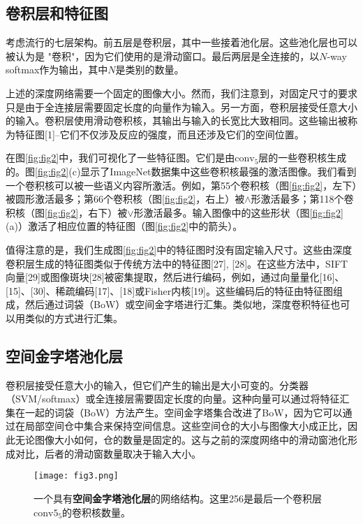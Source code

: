 \documentclass[../main.tex]{subfile}
\begin{document}
\subsection{卷积层和特征图}

考虑流行的七层架构\cite{alexnet, zfnet}。前五层是卷积层，其中一些接着池化层。这些池化层也可以被认为是 "卷积"，因为它们使用的是滑动窗口。最后两层是全连接的，以$N$-way softmax作为输出，其中$N$是类别的数量。

上述的深度网络需要一个固定的图像大小。然而，我们注意到，对固定尺寸的要求只是由于全连接层需要固定长度的向量作为输入。另一方面，卷积层接受任意大小的输入。卷积层使用滑动卷积核，其输出与输入的长宽比大致相同。这些输出被称为特征图[1]--它们不仅涉及反应的强度，而且还涉及它们的空间位置。

在图\ref{fig:fig2}中，我们可视化了一些特征图。它们是由$\text{conv}_5$层的一些卷积核生成的。图\ref{fig:fig2}(c)显示了ImageNet数据集中这些卷积核最强的激活图像。我们看到一个卷积核可以被一些语义内容所激活。例如，第55个卷积核（图\ref{fig:fig2}，左下）被圆形激活最多；第66个卷积核（图\ref{fig:fig2}，右上）被$\wedge $形激活最多；第118个卷积核（图\ref{fig:fig2}，右下）被$\vee $形激活最多。输入图像中的这些形状（图\ref{fig:fig2}(a)）激活了相应位置的特征图（图\ref{fig:fig2}中的箭头）。

值得注意的是，我们生成图\ref{fig:fig2}中的特征图时没有固定输入尺寸。这些由深度卷积层生成的特征图类似于传统方法中的特征图[27], [28]。在这些方法中，SIFT向量[29]或图像斑块[28]被密集提取，然后进行编码，例如，通过向量量化[16]、[15]、[30]、稀疏编码[17]、[18]或Fisher内核[19]。这些编码后的特征由特征图组成，然后通过词袋（BoW）\cite{bow}或空间金字塔\cite{sp1, sp2}进行汇集。类似地，深度卷积特征也可以用类似的方式进行汇集。

\subsection{空间金字塔池化层}

卷积层接受任意大小的输入，但它们产生的输出是大小可变的。分类器（SVM/softmax）或全连接层需要固定长度的向量。这种向量可以通过将特征汇集在一起的词袋（BoW）方法\cite{bow}产生。空间金字塔集合\cite{sp1, sp2}改进了BoW，因为它可以通过在局部空间仓中集合来保持空间信息。这些空间仓的大小与图像大小成正比，因此无论图像大小如何，仓的数量是固定的。这与之前的深度网络\cite{alexnet}中的滑动窗池化形成对比，后者的滑动窗数量取决于输入大小。


\begin{figure}[htb]
    \centering
    \texttt{[image: fig3.png]}
    \caption{一个具有\textbf{空间金字塔池化层}的网络结构。这里256是最后一个卷积层$\text{conv5}_5$的卷积核数量。}
    \label{fig:fig3}
\end{figure}
\end{document}
